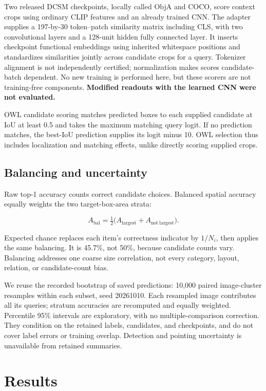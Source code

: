 \documentclass[10pt,twocolumn,letterpaper]{article}
\begin{document}
Two released DCSM checkpoints, locally called ObjA and COCO, score
context crops using ordinary CLIP features and an already trained CNN.
The adapter supplies a 197-by-30 token--patch similarity matrix
including CLS, with two convolutional layers and a 128-unit hidden fully
connected layer. It inserts checkpoint functional embeddings using
inherited whitespace positions and standardizes similarities jointly
across candidate crops for a query. Tokenizer alignment is not
independently certified; normalization makes scores candidate-batch
dependent. No new training is performed here, but these scorers are not
training-free components. \textbf{Modified readouts with the learned CNN
were not evaluated.}

OWL candidate scoring matches predicted boxes to each supplied candidate
at IoU at least 0.5 and takes the maximum matching query logit. If no
prediction matches, the best-IoU prediction supplies its logit minus 10.
OWL selection thus includes localization and matching effects, unlike
directly scoring supplied crops.

\subsection{Balancing and uncertainty}\label{balancing-and-uncertainty}

Raw top-1 accuracy counts correct candidate choices. Balanced spatial
accuracy equally weights the two target-box-area strata:

\[
A_{\mathrm{bal}}=\tfrac12\big(A_{\mathrm{largest}}+A_{\mathrm{not\ largest}}\big).
\]

Expected chance replaces each item's correctness indicator by \(1/N_i\),
then applies the same balancing. It is 45.7\%, not 50\%, because
candidate counts vary. Balancing addresses one coarse size correlation,
not every category, layout, relation, or candidate-count bias.

We reuse the recorded bootstrap of saved predictions: 10,000 paired
image-cluster resamples within each subset, seed 20261010. Each
resampled image contributes all its queries; stratum accuracies are
recomputed and equally weighted. Percentile 95\% intervals are
exploratory, with no multiple-comparison correction. They condition on
the retained labels, candidates, and checkpoints, and do not cover label
errors or training overlap. Detection and pointing uncertainty is
unavailable from retained summaries.

\section{Results}\label{results}
\end{document}
